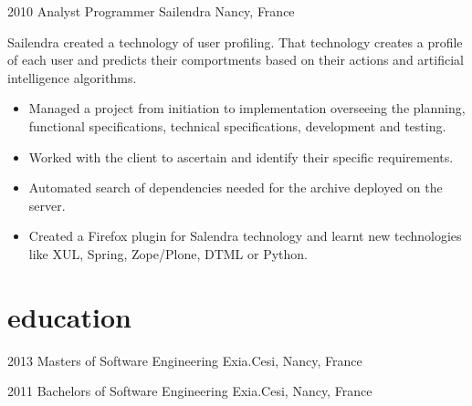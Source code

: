 \documentclass[]{friggeri-cv} %
\begin{document}

\begin{entrylist}

\entry
{2010}
{Analyst Programmer} 
{Sailendra}
{Nancy, France}
{Sailendra created a technology of user profiling. That technology creates a profile of each user and predicts their comportments based on their actions and artificial intelligence algorithms.\\

\vspace{-4mm}
\begin{itemize}
	\item Managed a project from initiation to implementation overseeing the planning, functional specifications, technical specifications, development and testing.
	\item Worked with the client to ascertain and identify their specific requirements.
	\item Automated search of dependencies needed for the archive deployed on the server.
    \item Created a Firefox plugin for Salendra technology and learnt new technologies like XUL, Spring, Zope/Plone, DTML or Python.
\end{itemize}}
\vspace{-7mm}

\end{entrylist}


\section{education}

\begin{entrylist}


\entry
{2013}
{Masters {\normalfont of Software Engineering}}
{}
{Exia.Cesi, Nancy, France}
{}


\entry
{2011}
{Bachelors {\normalfont of Software Engineering}}
{}
{Exia.Cesi, Nancy, France}
{}


\end{entrylist}
\end{document}
